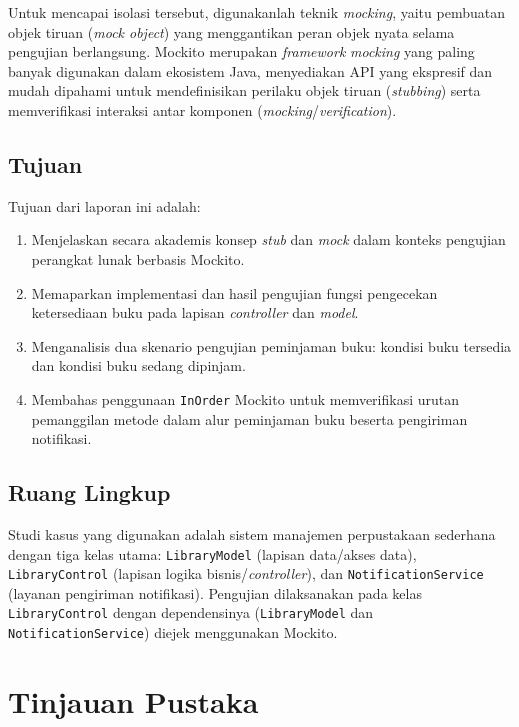 \documentclass[12pt,a4paper]{article}
\begin{document}
Untuk mencapai isolasi tersebut, digunakanlah teknik \textit{mocking}, yaitu
pembuatan objek tiruan (\textit{mock object}) yang menggantikan peran objek
nyata selama pengujian berlangsung. Mockito merupakan \textit{framework}
\textit{mocking} yang paling banyak digunakan dalam ekosistem Java, menyediakan
API yang ekspresif dan mudah dipahami untuk mendefinisikan perilaku objek tiruan
(\textit{stubbing}) serta memverifikasi interaksi antar komponen
(\textit{mocking}/\textit{verification}).

\subsection{Tujuan}

Tujuan dari laporan ini adalah:
\begin{enumerate}[label=\arabic*.]
    \item Menjelaskan secara akademis konsep \textit{stub} dan \textit{mock}
          dalam konteks pengujian perangkat lunak berbasis Mockito.
    \item Memaparkan implementasi dan hasil pengujian fungsi pengecekan
          ketersediaan buku pada lapisan \textit{controller} dan \textit{model}.
    \item Menganalisis dua skenario pengujian peminjaman buku:
          kondisi buku tersedia dan kondisi buku sedang dipinjam.
    \item Membahas penggunaan \texttt{InOrder} Mockito untuk memverifikasi
          urutan pemanggilan metode dalam alur peminjaman buku beserta
          pengiriman notifikasi.
\end{enumerate}

\subsection{Ruang Lingkup}

Studi kasus yang digunakan adalah sistem manajemen perpustakaan sederhana dengan
tiga kelas utama: \texttt{LibraryModel} (lapisan data/akses data),
\texttt{LibraryControl} (lapisan logika bisnis/\textit{controller}), dan
\texttt{NotificationService} (layanan pengiriman notifikasi). Pengujian
dilaksanakan pada kelas \texttt{LibraryControl} dengan dependensinya
(\texttt{LibraryModel} dan \texttt{NotificationService}) diejek menggunakan
Mockito.

\section{Tinjauan Pustaka}
\end{document}
